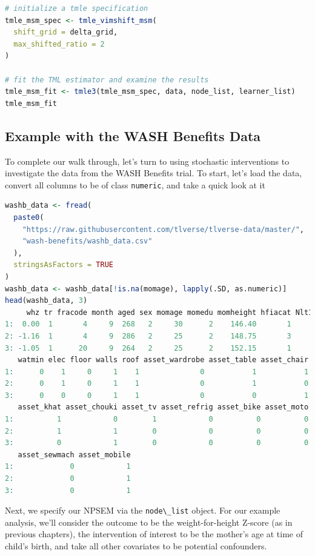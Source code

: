 \documentclass[
  12pt, krantz2,
]{krantz}
\newcommand{\passthrough}[1]{#1}
\theoremstyle{definition}
\theoremstyle{definition}
\theoremstyle{definition}
\newcommand{\1}{\mathbbm{1}}
\begin{document}
\begin{lstlisting}[language=R]
# initialize a tmle specification
tmle_msm_spec <- tmle_vimshift_msm(
  shift_grid = delta_grid,
  max_shifted_ratio = 2
)

# fit the TML estimator and examine the results
tmle_msm_fit <- tmle3(tmle_msm_spec, data, node_list, learner_list)
tmle_msm_fit
\end{lstlisting}

\hypertarget{example-with-the-wash-benefits-data}{%
\subsection{Example with the WASH Benefits Data}\label{example-with-the-wash-benefits-data}}

To complete our walk through, let's turn to using stochastic interventions to
investigate the data from the WASH Benefits trial. To start, let's load the
data, convert all columns to be of class \passthrough{\lstinline!numeric!}, and take a quick look at it

\begin{lstlisting}[language=R]
washb_data <- fread(
  paste0(
    "https://raw.githubusercontent.com/tlverse/tlverse-data/master/",
    "wash-benefits/washb_data.csv"
  ),
  stringsAsFactors = TRUE
)
washb_data <- washb_data[!is.na(momage), lapply(.SD, as.numeric)]
head(washb_data, 3)
     whz tr fracode month aged sex momage momedu momheight hfiacat Nlt18 Ncomp
1:  0.00  1       4     9  268   2     30      2    146.40       1     3    11
2: -1.16  1       4     9  286   2     25      2    148.75       3     2     4
3: -1.05  1      20     9  264   2     25      2    152.15       1     1    10
   watmin elec floor walls roof asset_wardrobe asset_table asset_chair
1:      0    1     0     1    1              0           1           1
2:      0    1     0     1    1              0           1           0
3:      0    0     0     1    1              0           0           1
   asset_khat asset_chouki asset_tv asset_refrig asset_bike asset_moto
1:          1            0        1            0          0          0
2:          1            1        0            0          0          0
3:          0            1        0            0          0          0
   asset_sewmach asset_mobile
1:             0            1
2:             0            1
3:             0            1
\end{lstlisting}

Next, we specify our NPSEM via the \passthrough{\lstinline!node\_list!} object. For our example analysis,
we'll consider the outcome to be the weight-for-height Z-score (as in previous
chapters), the intervention of interest to be the mother's age at time of
child's birth, and take all other covariates to be potential confounders.
\end{document}
